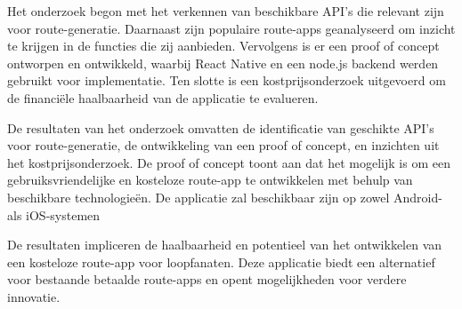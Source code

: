 Het onderzoek begon met het verkennen van beschikbare API's die relevant zijn voor route-generatie. Daarnaast zijn populaire route-apps geanalyseerd om inzicht te krijgen in de functies die zij aanbieden. 
Vervolgens is er een proof of concept ontworpen en ontwikkeld, waarbij React Native en een node.js backend werden gebruikt voor implementatie. 
Ten slotte is een kostprijsonderzoek uitgevoerd om de financiële haalbaarheid van de applicatie te evalueren.

De resultaten van het onderzoek omvatten de identificatie van geschikte API's voor route-generatie, de ontwikkeling van een proof of concept, en inzichten uit het kostprijsonderzoek. 
De proof of concept toont aan dat het mogelijk is om een gebruiksvriendelijke en kosteloze route-app te ontwikkelen met behulp van beschikbare technologieën.
De applicatie zal beschikbaar zijn op zowel Android- als iOS-systemen

De resultaten impliceren de haalbaarheid en potentieel van het ontwikkelen van een kosteloze route-app voor loopfanaten. 
Deze applicatie biedt een alternatief voor bestaande betaalde route-apps en opent mogelijkheden voor verdere innovatie. 

\chapter*{}

\lipsum[1-4]
